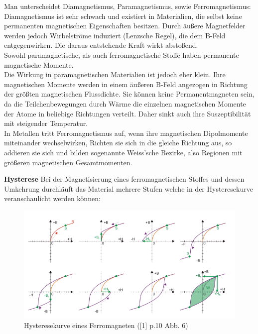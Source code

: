 \documentclass[12pt,a4paper]{article}
\begin{document}
\begin{multicols}{2}
Man unterscheidet Diamagnetismus, Paramagnetismus, sowie Ferromagnetismus:\\
Diamagnetismus ist sehr schwach und existiert in Materialien, die selbst keine permanenten magnetischen Eigenschaften besitzen. Durch äußere Magnetfelder werden jedoch Wirbelströme induziert (Lenzsche Regel), die dem B-Feld entgegenwirken. Die daraus entstehende Kraft wirkt abstoßend.\\

Sowohl paramagnetische, als auch ferromagnetische Stoffe haben permanente magnetische Momente.\\
Die Wirkung in paramagnetischen Materialien ist jedoch eher klein. Ihre magnetischen Momente werden in einem äußeren B-Feld angezogen in Richtung der größten magnetischen Flussdichte. Sie können keine Permanentmagneten sein, da die Teilchenbewegungen durch Wärme die einzelnen magnetischen Momente der Atome in beliebige Richtungen verteilt. Daher sinkt auch ihre Suszeptibilität mit steigender Temperatur.\\

In Metallen tritt Ferromagnetismus auf, wenn ihre magnetischen Dipolmomente miteinander wechselwirken, Richten sie sich in die gleiche Richtung aus, so addieren sie sich und bilden sogenannte Weiss'sche Bezirke, also Regionen mit größeren magnetischen Gesamtmomenten.



\textbf{Hysterese}
Bei der Magnetisierung eines ferromagnetischen Stoffes und dessen Umkehrung durchläuft das Material mehrere Stufen welche in der Hysteresekurve veranschaulicht werden können:

\begin{figure}[H]
	\centering
	\includegraphics[scale=0.3]{./figures/hysterese.png}
	\caption{Hysteresekurve eines Ferromagneten ([1] p.10 Abb. 6)}
	\label{fig:hysterese}
\end{figure}


\end{multicols}
\end{document}
